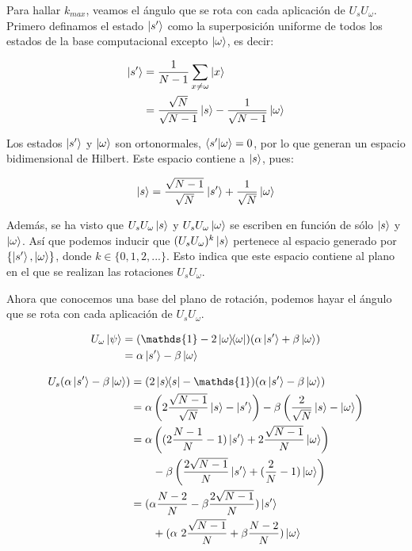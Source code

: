 Para hallar $k_{max}$, veamos el ángulo que se rota con cada aplicación de $U_s U_\omega$. Primero definamos el estado $\ket{s^\prime}$ como la superposición uniforme de todos los estados de la base computacional excepto $\ket{\omega}$, es decir:

\begin{align}
    \ket{s^\prime} &= \frac{1}{N-1} \sum\limits_{x \neq \omega} \ket{x} \\
               &= \frac{\sqrt{N}}{\sqrt{N-1}}\ket{s} - \frac{1}{\sqrt{N-1}} \ket{\omega}
\end{align}

Los estados $\ket{s^\prime}$ y $\ket{\omega}$ son ortonormales, $\braket{s^\prime}{\omega} = 0$, por lo que generan un espacio bidimensional de Hilbert. Este espacio contiene a $\ket{s}$, pues:

\begin{equation}
    \ket{s} = \frac{\sqrt{N-1}}{\sqrt{N}}\ket{s^\prime} + \frac{1}{\sqrt{N}}\ket{\omega}
\end{equation}

Además, se ha visto que $U_s U_\omega \ket{s}$ y $U_s U_\omega \ket{\omega}$ se escriben en función de sólo $\ket{s}$ y $\ket{\omega}$. Así que podemos inducir que $(U_s U_\omega)^k \ket{s}$ pertenece al espacio generado por $\{\ket{s^\prime}, \ket{\omega}\}$, donde $k \in \{0, 1, 2, ...\}$. Esto indica que este espacio contiene al plano en el que se realizan las rotaciones $U_s U_\omega$.

Ahora que conocemos una base del plano de rotación, podemos hayar el ángulo que se rota con cada aplicación de $U_s U_\omega$.

\begin{align*}
    U_\omega \ket{\psi}
    &= (\mathds{1} - 2 \ketbra{\omega}{\omega}) (\alpha \ket{s^\prime} + \beta \ket{\omega}) \\
    &= \alpha \ket{s^\prime} - \beta \ket{\omega}
\end{align*}

\begin{align*}
    U_s (\alpha \ket{s^\prime} - \beta \ket{\omega})
    &= (2 \ketbra{s}{s} - \mathds{1}) (\alpha \ket{s^\prime} - \beta \ket{\omega}) \\
    &= \alpha \left(2 \frac{\sqrt{N-1}}{\sqrt{N}} \ket{s} - \ket{s^\prime}\right) - \beta \left(\frac{2}{\sqrt{N}} \ket{s} - \ket{\omega}\right) \\
    &= \alpha \left((2\frac{N-1}{N} - 1) \ket{s^\prime} + 2\frac{\sqrt{N-1}}{N}\ket{\omega}\right) \\
    &\qquad - \beta \left(\frac{2\sqrt{N-1}}{N}\ket{s^\prime} + (\frac{2}{N}-1)\ket{\omega}\right) \\
    &= (\alpha \frac{N-2}{N} - \beta \frac{2\sqrt{N-1}}{N}) \ket{s^\prime} \\
    &\qquad + (\alpha\ 2\frac{\sqrt{N-1}}{N} + \beta  \frac{N-2}{N}) \ket{\omega} \\
\end{align*}

